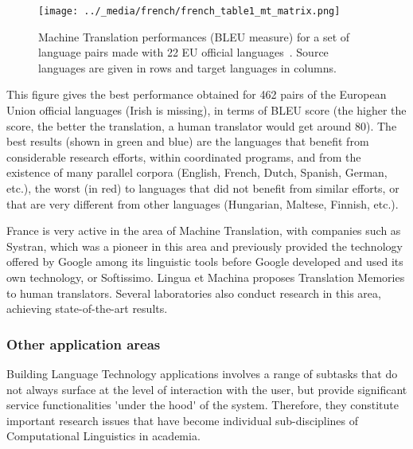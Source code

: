 \begin{multicols}{2}
\begin{figure}[!ht]
\begin{center}
  \texttt{[image: ../\_media/french/french\_table1\_mt\_matrix.png]}
  \caption{Machine Translation performances (BLEU measure) for a set of language pairs made with 22 EU official languages~\cite{mt462}. Source languages are given in rows and target languages in columns.}
  \label{fig:euromatrixplus}
\end{center}
\end{figure}

This figure gives the best performance obtained for 462 pairs of the
European Union official languages (Irish is missing), in terms of BLEU
score (the higher the score, the better the translation, a human
translator would get around 80). The best results (shown in green and
blue) are the languages that benefit from considerable research
efforts, within coordinated programs, and from the existence of many
parallel corpora (English, French, Dutch, Spanish, German, etc.), the
worst (in red) to languages that did not benefit from similar efforts,
or that are very different from other languages (Hungarian, Maltese,
Finnish, etc.).

France is very active in the area of Machine Translation, with
companies such as Systran, which was a pioneer in this area and
previously provided the technology offered by Google among its
linguistic tools before Google developed and used its own technology,
or Softissimo. Lingua et Machina proposes Translation Memories to
human translators. Several laboratories also conduct research in this
area, achieving state-of-the-art results.

\subsubsection{Other application areas}

Building Language Technology applications involves a range of subtasks
that do not always surface at the level of interaction with the user,
but provide significant service functionalities {\mbox '}under the hood{\mbox '} of
the system. Therefore, they constitute important research issues that
have become individual sub-disciplines of Computational Linguistics in
academia.


\end{multicols}
